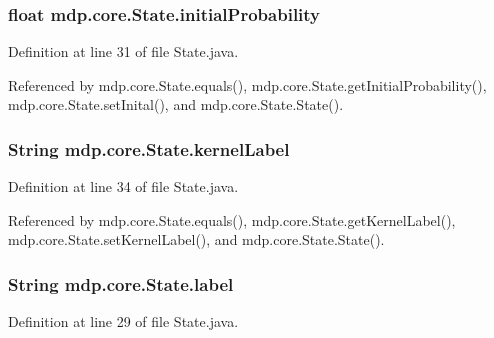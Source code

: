 \subsubsection[{initial\+Probability}]{\setlength{\rightskip}{0pt plus 5cm}float mdp.\+core.\+State.\+initial\+Probability\hspace{0.3cm}{\ttfamily [private]}}\label{classmdp_1_1core_1_1_state_a237d2d5f81db0553a2180cf66a20472b}


Definition at line 31 of file State.\+java.



Referenced by mdp.\+core.\+State.\+equals(), mdp.\+core.\+State.\+get\+Initial\+Probability(), mdp.\+core.\+State.\+set\+Inital(), and mdp.\+core.\+State.\+State().

\hypertarget{classmdp_1_1core_1_1_state_ac7ca184df7a0ec4141766692290c18ab}{}
\subsubsection[{kernel\+Label}]{\setlength{\rightskip}{0pt plus 5cm}String mdp.\+core.\+State.\+kernel\+Label\hspace{0.3cm}{\ttfamily [private]}}\label{classmdp_1_1core_1_1_state_ac7ca184df7a0ec4141766692290c18ab}


Definition at line 34 of file State.\+java.



Referenced by mdp.\+core.\+State.\+equals(), mdp.\+core.\+State.\+get\+Kernel\+Label(), mdp.\+core.\+State.\+set\+Kernel\+Label(), and mdp.\+core.\+State.\+State().

\hypertarget{classmdp_1_1core_1_1_state_a40b54cc46e175c748d5ce129aba70633}{}
\subsubsection[{label}]{\setlength{\rightskip}{0pt plus 5cm}String mdp.\+core.\+State.\+label\hspace{0.3cm}{\ttfamily [private]}}\label{classmdp_1_1core_1_1_state_a40b54cc46e175c748d5ce129aba70633}


Definition at line 29 of file State.\+java.



